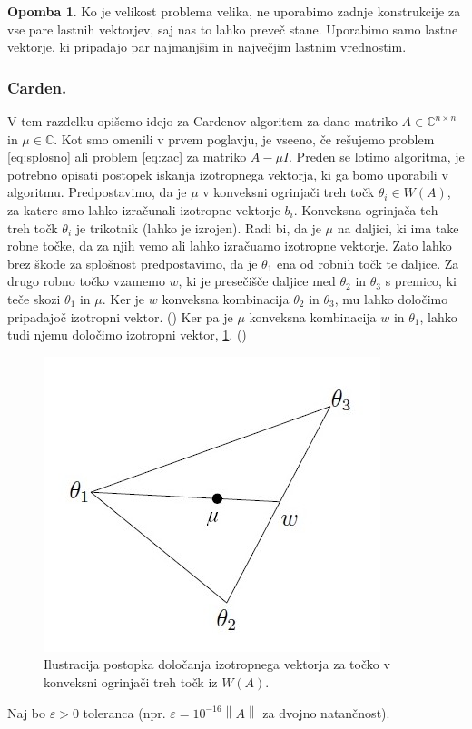 \documentclass[12pt,a4paper]{amsart}
\theoremstyle{definition}
\newtheorem{opomba}[definicija]{Opomba}
\theoremstyle{plain}
\newcommand{\C}{\mathbb C}
\newcommand{\norm}[1]{\left\lVert#1\right\rVert}
\begin{document}
\begin{opomba}
Ko je velikost problema velika, ne uporabimo zadnje konstrukcije za vse pare lastnih vektorjev, saj nas to lahko preveč stane. Uporabimo samo lastne vektorje, ki pripadajo par najmanjšim in največjim lastnim vrednostim.
\end{opomba}
\subsubsection{Carden.}
V tem razdelku opišemo idejo za Cardenov algoritem \cite{carden} za dano matriko $A \in \C^{n\times n}$ in $\mu \in \C$. Kot smo omenili v prvem poglavju, je vseeno, če rešujemo problem \eqref{eq:splosno} ali problem \eqref{eq:zac} za matriko $A-\mu I$. Preden se lotimo algoritma, je potrebno opisati postopek iskanja izotropnega vektorja, ki ga bomo uporabili v algoritmu. Predpostavimo, da je $\mu$ v konveksni ogrinjači treh točk $\theta_i \in W(A)$, za katere smo lahko izračunali izotropne vektorje $b_i$. Konveksna ogrinjača teh treh točk $\theta_i$ je trikotnik (lahko je izrojen). Radi bi, da je $\mu$ na daljici, ki ima take robne točke, da za njih vemo ali lahko izračuamo izotropne vektorje. Zato lahko brez škode za splošnost predpostavimo, da je $\theta_1$ ena od robnih točk te daljice. Za drugo robno točko vzamemo $w$, ki je presečišče daljice med $\theta_2$ in $\theta_3$ s premico, ki teče skozi $\theta_1$ in $\mu$. Ker je $w$ konveksna kombinacija $\theta_2$ in $\theta_3$, mu lahko določimo pripadajoč izotropni vektor. (\cite{meurant})
Ker pa je $\mu$ konveksna kombinacija $w$ in $\theta_1$, lahko tudi njemu določimo izotropni vektor, \ref{fig:triangle}. (\cite{carden})\\
\begin{figure} [h]
\centering
\includegraphics[scale=0.7]{triangle}
\caption{Ilustracija postopka določanja izotropnega vektorja za točko v konveksni ogrinjači treh točk iz $W(A)$.}
\label{fig:triangle}
\end{figure}
Naj bo $\varepsilon >0$ toleranca (npr. $\varepsilon=10^{-16}\norm{A}$ za dvojno natančnost). 
\end{document}
